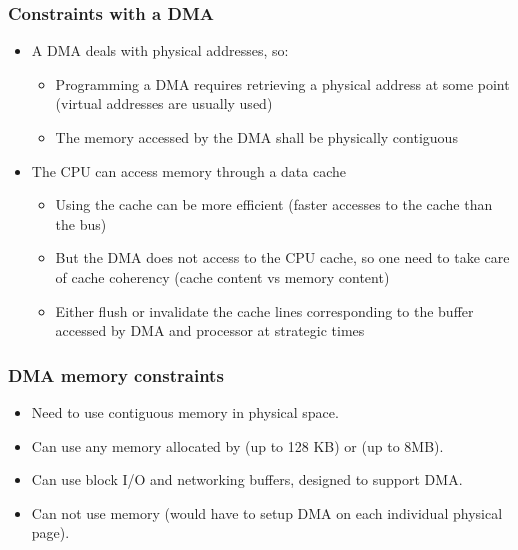 \begin{frame}
  \frametitle{Constraints with a DMA}
  \begin{itemize}
  \item A DMA deals with physical addresses, so:
    \begin{itemize}
    \item Programming a DMA requires retrieving a physical address at
      some point (virtual addresses are usually used)
    \item The memory accessed by the DMA shall be physically
      contiguous
    \end{itemize}
  \item The CPU can access memory through a data cache
    \begin{itemize}
    \item Using the cache can be more efficient (faster accesses to
      the cache than the bus)
    \item But the DMA does not access to the CPU cache, so one need to
      take care of cache coherency (cache content vs memory content)
    \item Either flush or invalidate the cache lines corresponding to
      the buffer accessed by DMA and processor at strategic times
    \end{itemize}
  \end{itemize}
\end{frame}

\begin{frame}
  \frametitle{DMA memory constraints}
  \begin{itemize}
  \item Need to use contiguous memory in physical space.
  \item Can use any memory allocated by  (up to 128 KB)
    or  (up to 8MB).
  \item Can use block I/O and networking buffers, designed to support
    DMA.
  \item Can not use  memory (would have to setup DMA on each
    individual physical page).
  \end{itemize}
\end{frame}

